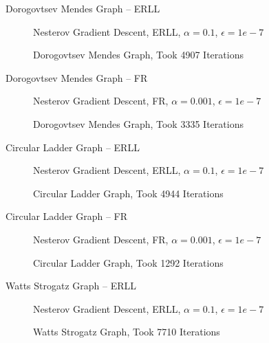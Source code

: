 \documentclass{beamer}
\begin{document}
\begin{frame}{Dorogovtsev Mendes Graph -- ERLL}
    \begin{figure}[H]
    \centering
    Nesterov Gradient Descent, ERLL, $\alpha=0.1$, $\epsilon=1e-7$
    
    \caption{\label{dorogovtsev-mendes-nesterov-erll} Dorogovtsev Mendes Graph, Took 4907 Iterations}
    \end{figure}
\end{frame}

\begin{frame}{Dorogovtsev Mendes Graph -- FR}
    \begin{figure}[H]
    \centering
    Nesterov Gradient Descent, FR, $\alpha=0.001$, $\epsilon=1e-7$
    
    \caption{\label{dorogovtsev-mendes-nesterov-fr} Dorogovtsev Mendes Graph, Took 3335 Iterations}
    \end{figure}
\end{frame}

\begin{frame}{Circular Ladder Graph -- ERLL}
    \begin{figure}[H]
    \centering
    Nesterov Gradient Descent, ERLL, $\alpha=0.1$, $\epsilon=1e-7$
    
    \caption{\label{circular-ladder-nesterov-erll} Circular Ladder Graph, Took 4944 Iterations}
    \end{figure}
\end{frame}

\begin{frame}{Circular Ladder Graph -- FR}
    \begin{figure}[H]
    \centering
    Nesterov Gradient Descent, FR, $\alpha=0.001$, $\epsilon=1e-7$
    
    \caption{\label{circular-ladder-nesterov-fr} Circular Ladder Graph, Took 1292 Iterations}
    \end{figure}
\end{frame}

\begin{frame}{Watts Strogatz Graph -- ERLL}
    \begin{figure}[H]
    \centering
    Nesterov Gradient Descent, ERLL, $\alpha=0.1$, $\epsilon=1e-7$
    
    \caption{\label{watts-strogatz-nesterov-erll} Watts Strogatz Graph, Took 7710 Iterations}
    \end{figure}
\end{frame}
\end{document}
